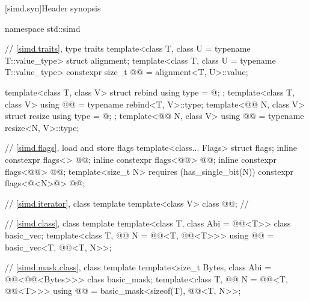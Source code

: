 [simd.syn]{Header  synopsis}
%
\begin{codeblock}
namespace std::simd {
  // \ref{simd.traits},  type traits
  template<class T, class U = typename T::value_type> struct alignment;
  template<class T, class U = typename T::value_type>
    constexpr size_t @@ = alignment<T, U>::value;

  template<class T, class V> struct rebind { using type = @\seebelow@; };
  template<class T, class V> using @@ = typename rebind<T, V>::type;
  template<@@ N, class V> struct resize { using type = @\seebelow@; };
  template<@@ N, class V> using @@ = typename resize<N, V>::type;

  // \ref{simd.flags}, load and store flags
  template<class... Flags> struct flags;
  inline constexpr flags<> @@{};
  inline constexpr flags<@@> @@{};
  inline constexpr flags<@@> @@{};
  template<size_t N> requires (has_single_bit(N))
    constexpr flags<@<N>@> @@{};

  // \ref{simd.iterator}, class template 
  template<class V>
    class @@;                // \expos

  // \ref{simd.class}, class template 
  template<class T, class Abi = @@<T>> class basic_vec;
  template<class T, @@ N = @@<T, @@<T>>>
    using @@ = basic_vec<T, @@<T, N>>;

  // \ref{simd.mask.class}, class template 
  template<size_t Bytes, class Abi = @@<@@<Bytes>>> class basic_mask;
  template<class T, @@ N = @@<T, @@<T>>>
    using @@ = basic_mask<sizeof(T), @@<T, N>>;

}
\end{codeblock}
